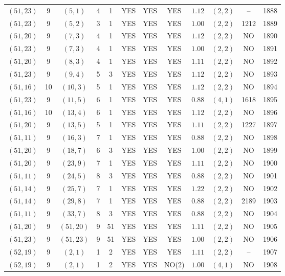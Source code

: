 \begin{longtable}{|c|c|c|c|c|c|c|c|c|c|c|c|}
$(51,23)$ & 9 & $(5,1)$ & 4 & 1 & YES & YES & YES & $1.12$ & $(2,2)$ & -- & 1888\\
$(51,23)$ & 9 & $(5,2)$ & 3 & 1 & YES & YES & YES & $1.00$ & $(2,2)$ & 1212 & 1889\\
$(51,20)$ & 9 & $(7,3)$ & 4 & 1 & YES & YES & YES & $1.12$ & $(2,2)$ & NO & 1890\\
$(51,23)$ & 9 & $(7,3)$ & 4 & 1 & YES & YES & YES & $1.00$ & $(2,2)$ & NO & 1891\\
$(51,20)$ & 9 & $(8,3)$ & 4 & 1 & YES & YES & YES & $1.11$ & $(2,2)$ & NO & 1892\\
$(51,23)$ & 9 & $(9,4)$ & 5 & 3 & YES & YES & YES & $1.12$ & $(2,2)$ & NO & 1893\\
$(51,16)$ & 10 & $(10,3)$ & 5 & 1 & YES & YES & YES & $1.12$ & $(2,2)$ & NO & 1894\\
$(51,23)$ & 9 & $(11,5)$ & 6 & 1 & YES & YES & YES & $0.88$ & $(4,1)$ & 1618 & 1895\\
$(51,16)$ & 10 & $(13,4)$ & 6 & 1 & YES & YES & YES & $1.12$ & $(2,2)$ & NO & 1896\\
$(51,20)$ & 9 & $(13,5)$ & 5 & 1 & YES & YES & YES & $1.11$ & $(2,2)$ & 1227 & 1897\\
$(51,11)$ & 9 & $(16,3)$ & 7 & 1 & YES & YES & YES & $0.88$ & $(2,2)$ & NO & 1898\\
$(51,20)$ & 9 & $(18,7)$ & 6 & 3 & YES & YES & YES & $1.00$ & $(2,2)$ & NO & 1899\\
$(51,20)$ & 9 & $(23,9)$ & 7 & 1 & YES & YES & YES & $1.11$ & $(2,2)$ & NO & 1900\\
$(51,11)$ & 9 & $(24,5)$ & 8 & 3 & YES & YES & YES & $0.88$ & $(2,2)$ & NO & 1901\\
$(51,14)$ & 9 & $(25,7)$ & 7 & 1 & YES & YES & YES & $1.22$ & $(2,2)$ & NO & 1902\\
$(51,14)$ & 9 & $(29,8)$ & 7 & 1 & YES & YES & YES & $0.88$ & $(2,2)$ & 2189 & 1903\\
$(51,11)$ & 9 & $(33,7)$ & 8 & 3 & YES & YES & YES & $0.88$ & $(2,2)$ & NO & 1904\\
$(51,20)$ & 9 & $(51,20)$ & 9 & 51 & YES & YES & YES & $1.11$ & $(2,2)$ & NO & 1905\\
$(51,23)$ & 9 & $(51,23)$ & 9 & 51 & YES & YES & YES & $1.00$ & $(2,2)$ & NO & 1906\\
$(52,19)$ & 9 & $(2,1)$ & 1 & 2 & YES & YES & YES & $1.11$ & $(2,2)$ & -- & 1907\\
$(52,19)$ & 9 & $(2,1)$ & 1 & 2 & YES & YES & NO(2) & $1.00$ & $(4,1)$ & NO & 1908\\

\end{longtable}
